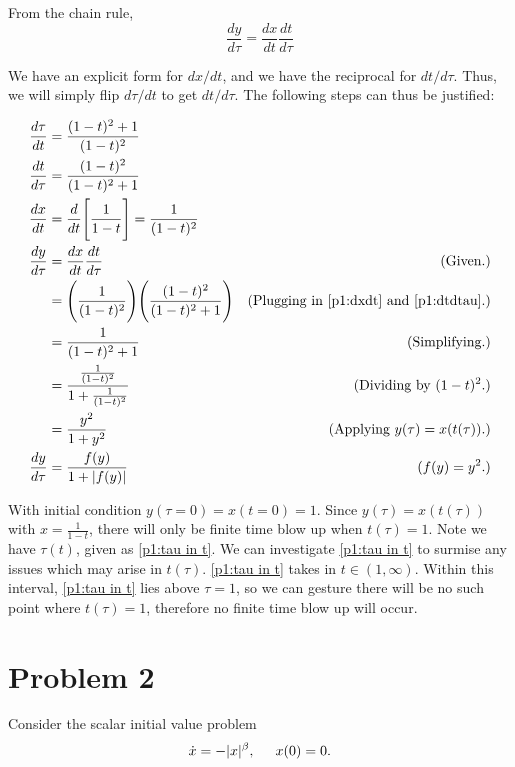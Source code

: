 \begin{solution}
    From the chain rule,
    \[\frac{dy}{d\tau} = \frac{dx}{dt}\frac{dt}{d\tau}\]

    We have an explicit form for $dx/dt$, and we have the reciprocal for $dt/d\tau$. Thus, we will simply flip $d\tau/dt$ to get $dt/d\tau$. The following steps can thus be justified:

    \newpage
    \alignbreak
    \begin{align}
        \frac{d\tau}{dt} &= \frac{(1 - t)^2 + 1}{(1 - t)^2} \nonumber\\
        \frac{dt}{d\tau} &= \frac{(1 - t)^2}{(1 - t)^2 + 1} \label{p1:dtdtau}\\  
        \frac{dx}{dt} &= \frac{d}{dt}\Bigg[ \frac{1}{1 - t}\Bigg] = \frac{1}{(1 - t)^2} \label{p1:dxdt}\\
        \frac{dy}{d\tau} &= \frac{dx}{dt}\frac{dt}{d\tau} &\text{(Given.)}\nonumber\\
        &= \Bigg(\frac{1}{(1 - t)^2}\Bigg)\Bigg( \frac{(1 - t)^2}{(1 - t)^2 + 1}\Bigg) &\text{(Plugging in \ref{p1:dxdt} and \ref{p1:dtdtau}.)}\nonumber\\
        &= \frac{1}{(1 - t)^2 + 1} &\text{(Simplifying.)}\nonumber\\
        &= \frac{\frac{1}{(1 - t)^2}}{1 + \frac{1}{(1 - t)^2}} &\text{(Dividing by $(1 - t)^2$.)}\nonumber\\
        &= \frac{y^2}{1 + y^2} &\text{(Applying $y(\tau) = x(t(\tau))$.)}\nonumber\\
        \frac{dy}{d\tau} &= \frac{f(y)}{1 + |f(y)|} &\text{($f(y) = y^2$.)}\nonumber
    \end{align}
    \alignbreak

    With initial condition $y(\tau = 0) = x(t = 0) = 1$. Since $y(\tau) = x(t(\tau))$ with $x = \frac{1}{1 - t}$, there will only be finite time blow up when $t(\tau) = 1$. Note we have $\tau(t)$, given as \ref{p1:tau in t}. We can investigate \ref{p1:tau in t} to surmise any issues which may arise in $t(\tau)$. \ref{p1:tau in t} takes in $t \in (1, \infty)$. Within this interval, \ref{p1:tau in t} lies above $\tau = 1$, so we can gesture there will be no such point where $t(\tau) = 1$, therefore no finite time blow up will occur. 
\end{solution}%

\newpage

\section{Problem 2}
Consider the scalar initial value problem
\begin{align}
    \dot{x} = -|x|^\beta, \hspace{5mm} x(0) = 0. \label{p2:ODE}
\end{align}

